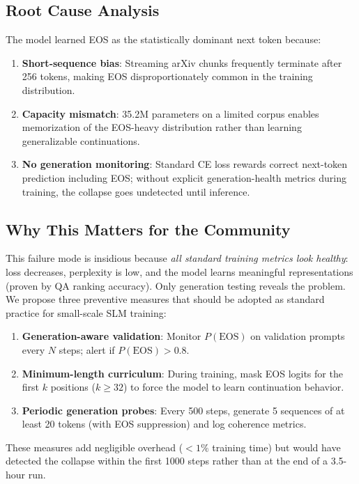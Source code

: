 \documentclass[11pt]{article}
\begin{document}
\subsection{Root Cause Analysis}

The model learned EOS as the statistically dominant next token because:
\begin{enumerate}[leftmargin=*]
    \item \textbf{Short-sequence bias}: Streaming arXiv chunks frequently terminate after 256 tokens, making EOS disproportionately common in the training distribution.
    \item \textbf{Capacity mismatch}: 35.2M parameters on a limited corpus enables memorization of the EOS-heavy distribution rather than learning generalizable continuations.
    \item \textbf{No generation monitoring}: Standard CE loss rewards correct next-token prediction including EOS; without explicit generation-health metrics during training, the collapse goes undetected until inference.
\end{enumerate}

\subsection{Why This Matters for the Community}

This failure mode is insidious because \emph{all standard training metrics look healthy}: loss decreases, perplexity is low, and the model learns meaningful representations (proven by QA ranking accuracy). Only generation testing reveals the problem. We propose three preventive measures that should be adopted as standard practice for small-scale SLM training:

\begin{enumerate}[leftmargin=*]
    \item \textbf{Generation-aware validation}: Monitor $P(\text{EOS})$ on validation prompts every $N$ steps; alert if $P(\text{EOS}) > 0.8$.
    \item \textbf{Minimum-length curriculum}: During training, mask EOS logits for the first $k$ positions ($k \geq 32$) to force the model to learn continuation behavior.
    \item \textbf{Periodic generation probes}: Every 500 steps, generate 5 sequences of at least 20 tokens (with EOS suppression) and log coherence metrics.
\end{enumerate}

These measures add negligible overhead ($< 1\%$ training time) but would have detected the collapse within the first 1000 steps rather than at the end of a 3.5-hour run.
\end{document}
